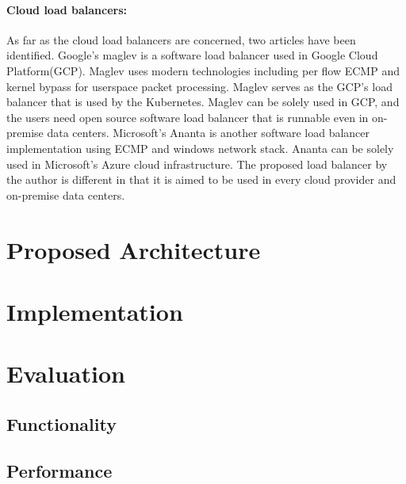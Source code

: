 \paragraph{\bf Cloud load balancers:}

As far as the cloud load balancers are concerned, two articles have been identified.
Google's maglev\cite{eisenbud2016maglev} is a software load balancer used in Google Cloud Platform(GCP)\cite{Voellm2013}.
Maglev uses modern technologies including per flow ECMP and kernel bypass for userspace packet processing.
Maglev serves as the GCP's load balancer that is used by the Kubernetes.
Maglev can be solely used in GCP, and the users need open source software load balancer that is runnable even in on-premise data centers.
Microsoft's Ananta\cite{patel2013ananta} is another software load balancer implementation using ECMP and windows network stack.
Ananta can be solely used in Microsoft's Azure cloud infrastructure\cite{patel2013ananta}.
The proposed load balancer by the author is different in that it is aimed to be used in every cloud provider and on-premise data centers.

\section{Proposed Architecture}\label{Architecture}



\section{Implementation}\label{Implementation}

\section{Evaluation}\label{Evaluation}

\subsection{Functionality}\label{Functionality}

\subsection{Performance}\label{Performance}



